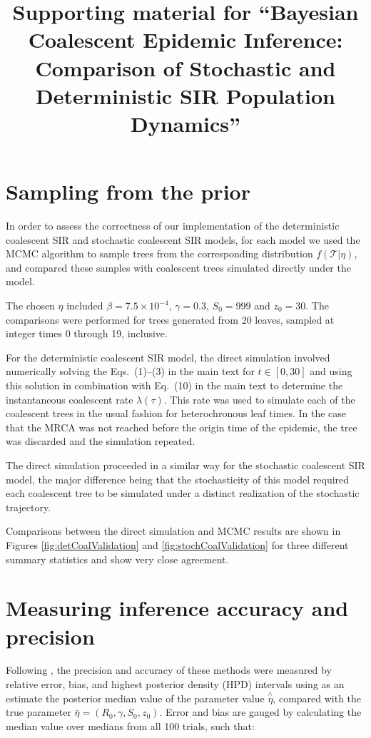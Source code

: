 \documentclass[10pt]{article}
\title{Supporting material for ``Bayesian Coalescent Epidemic Inference:  Comparison of Stochastic and Deterministic SIR Population Dynamics''}
\date{}
\newcommand{\tree}{\mathcal{T}}
\begin{document}
\maketitle{}


\section{Sampling from the prior}

In order to assess the correctness of our implementation of the
deterministic coalescent SIR and stochastic coalescent SIR models, for
each model we used the MCMC algorithm to sample trees from the
corresponding distribution $f(\tree|\eta)$, and compared these samples
with coalescent trees simulated directly under the model.

The chosen $\eta$ included $\beta=7.5\times 10^{-4}$, $\gamma=0.3$,
$S_0=999$ and $z_0=30$. The comparisons were performed for trees
generated from 20 leaves, sampled at integer times 0 through 19,
inclusive.

For the deterministic coalescent SIR model, the direct simulation
involved numerically solving the Eqs.~(1)--(3) in the main text for
$t\in[0,30]$ and using this solution in combination with Eq.~(10)
in the main text to determine the instantaneous coalescent rate
$\lambda(\tau)$. This rate was used to simulate each of the coalescent
trees in the usual fashion for heterochronous leaf times.  In the case
that the MRCA was not reached before the origin time of the epidemic,
the tree was discarded and the simulation repeated.

The direct simulation proceeded in a similar way for the stochastic
coalescent SIR model, the major difference being that the
stochasticity of this model required each coalescent tree to be
simulated under a distinct realization of the stochastic trajectory.

Comparisons between the direct simulation and MCMC results are shown
in Figures \ref{fig:detCoalValidation} and
\ref{fig:stochCoalValidation} for three different summary
statistics and show very close agreement.

\section{Measuring inference accuracy and precision}
Following \cite{Kuhnert:2014}, the precision and accuracy of these methods were measured by 
relative error, bias, and highest posterior density (HPD) intervals using as an estimate the posterior 
median value of the parameter value $\overset{\wedge}{\eta}$, compared with the true parameter 
$\bar{\eta} = (R_{0}, \gamma, S_{0}, z_{0})$.  Error and bias are gauged by calculating the 
median value over medians from all 100 trials, such that:
\end{document}
